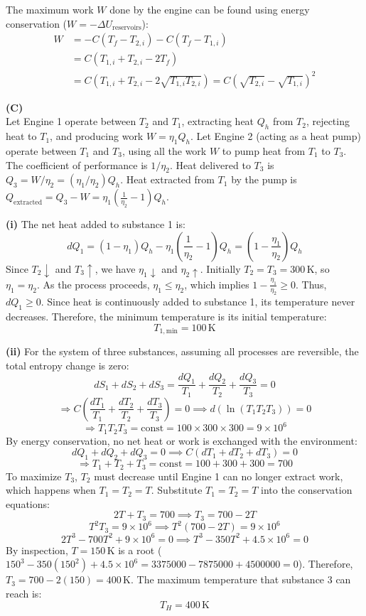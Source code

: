 The maximum work $W$ done by the engine can be found using energy conservation ($W = -\Delta U_{\text{reservoirs}}$):
\begin{align*}
W &= -C(T_f - T_{2,i}) - C(T_f - T_{1,i}) \\
  &= C(T_{1,i} + T_{2,i} - 2T_f) \\
  &= C\left(T_{1,i} + T_{2,i} - 2\sqrt{T_{1,i}T_{2,i}}\right) = C\left(\sqrt{T_{2,i}} - \sqrt{T_{1,i}}\right)^2
\end{align*}

\vspace{1em}
\textbf{(C)} \\
Let Engine 1 operate between $T_2$ and $T_1$, extracting heat $Q_h$ from $T_2$, rejecting heat to $T_1$, and producing work $W = \eta_1 Q_h$.
Let Engine 2 (acting as a heat pump) operate between $T_1$ and $T_3$, using all the work $W$ to pump heat from $T_1$ to $T_3$. The coefficient of performance is $1/\eta_2$.
Heat delivered to $T_3$ is $Q_3 = W/\eta_2 = (\eta_1/\eta_2)Q_h$.
Heat extracted from $T_1$ by the pump is $Q_{\text{extracted}} = Q_3 - W = \eta_1\left(\frac{1}{\eta_2}-1\right)Q_h$.

\textbf{(i)} The net heat added to substance 1 is:
\[ dQ_1 = (1-\eta_1)Q_h - \eta_1\left(\frac{1}{\eta_2}-1\right)Q_h = \left(1 - \frac{\eta_1}{\eta_2}\right)Q_h \]
Since $T_2 \downarrow$ and $T_3 \uparrow$, we have $\eta_1 \downarrow$ and $\eta_2 \uparrow$. Initially $T_2 = T_3 = 300\,\text{K}$, so $\eta_1 = \eta_2$.
As the process proceeds, $\eta_1 \le \eta_2$, which implies $1 - \frac{\eta_1}{\eta_2} \ge 0$.
Thus, $dQ_1 \ge 0$. Since heat is continuously added to substance 1, its temperature never decreases.
Therefore, the minimum temperature is its initial temperature:
\[ T_{1,\text{min}} = 100\,\text{K} \]

\textbf{(ii)} For the system of three substances, assuming all processes are reversible, the total entropy change is zero:
\[ dS_1 + dS_2 + dS_3 = \frac{dQ_1}{T_1} + \frac{dQ_2}{T_2} + \frac{dQ_3}{T_3} = 0 \]
\[ \Rightarrow C\left(\frac{dT_1}{T_1} + \frac{dT_2}{T_2} + \frac{dT_3}{T_3}\right) = 0 \implies d(\ln(T_1 T_2 T_3)) = 0 \]
\[ \Rightarrow T_1 T_2 T_3 = \text{const} = 100 \times 300 \times 300 = 9 \times 10^6 \]
By energy conservation, no net heat or work is exchanged with the environment:
\[ dQ_1 + dQ_2 + dQ_3 = 0 \implies C(dT_1 + dT_2 + dT_3) = 0 \]
\[ \Rightarrow T_1 + T_2 + T_3 = \text{const} = 100 + 300 + 300 = 700 \]
To maximize $T_3$, $T_2$ must decrease until Engine 1 can no longer extract work, which happens when $T_1 = T_2 = T$.
Substitute $T_1 = T_2 = T$ into the conservation equations:
\[ 2T + T_3 = 700 \implies T_3 = 700 - 2T \]
\[ T^2 T_3 = 9 \times 10^6 \implies T^2(700 - 2T) = 9 \times 10^6 \]
\[ 2T^3 - 700T^2 + 9 \times 10^6 = 0 \implies T^3 - 350T^2 + 4.5 \times 10^6 = 0 \]
By inspection, $T = 150\,\text{K}$ is a root ($150^3 - 350(150^2) + 4.5 \times 10^6 = 3375000 - 7875000 + 4500000 = 0$).
Therefore, $T_3 = 700 - 2(150) = 400\,\text{K}$.
The maximum temperature that substance 3 can reach is:
\[ T_H = 400\,\text{K} \]

